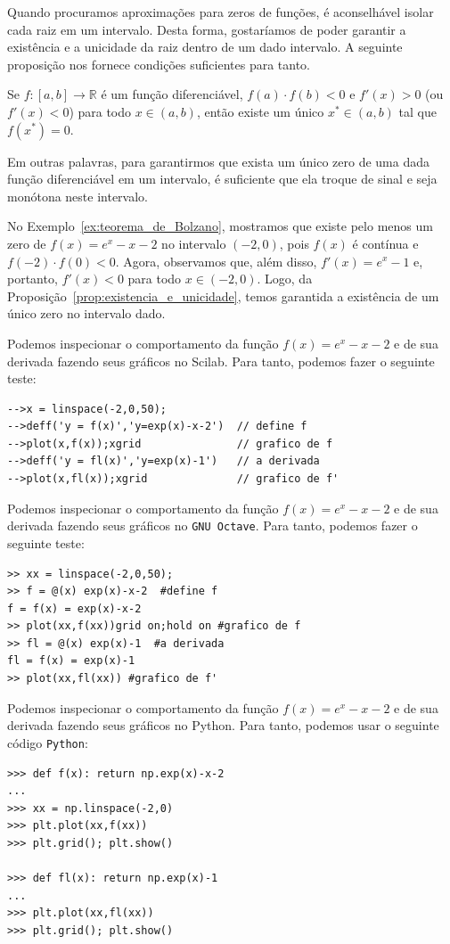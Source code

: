 Quando procuramos aproximações para zeros de funções, é aconselhável isolar cada raiz em um intervalo. Desta forma, gostaríamos de poder garantir a existência e a unicidade da raiz dentro de um dado intervalo. A seguinte proposição nos fornece condições suficientes para tanto.

\begin{prop}\label{prop:existencia_e_unicidade}
Se $f:[a, b]\to\mathbb{R}$ é um função diferenciável, $f(a)\cdot f(b)<0$ e $f'(x)>0$ (ou $f'(x)<0$) para todo $x\in(a, b)$, então existe um único $x^*\in (a, b)$ tal que $f(x^*) = 0$.
\end{prop}

Em outras palavras, para garantirmos que exista um único zero de uma dada função diferenciável em um intervalo, é suficiente que ela troque de sinal e seja monótona neste intervalo.

\begin{ex}
No Exemplo~\ref{ex:teorema_de_Bolzano}, mostramos que existe pelo menos um zero de $f(x) = e^{x}-x-2$ no intervalo $(-2,0)$, pois $f(x)$ é contínua e $f(-2)\cdot f(0) < 0$. Agora, observamos que, além disso, $f'(x)=e^x-1$ e, portanto, $f'(x) < 0$ para todo $x\in(-2,0)$. Logo, da Proposição~\ref{prop:existencia_e_unicidade}, temos garantida a existência de um único zero no intervalo dado.

\ifisscilab
Podemos inspecionar o comportamento da função $f(x)= e^x - x - 2$ e de sua derivada fazendo seus gráficos no Scilab. Para tanto, podemos fazer o seguinte teste:
\begin{verbatim}
-->x = linspace(-2,0,50);
-->deff('y = f(x)','y=exp(x)-x-2')  // define f
-->plot(x,f(x));xgrid               // grafico de f
-->deff('y = fl(x)','y=exp(x)-1')   // a derivada
-->plot(x,fl(x));xgrid              // grafico de f'
\end{verbatim}
\fi
\ifisoctave
Podemos inspecionar o comportamento da função $f(x)= e^x - x - 2$ e de sua derivada fazendo seus gráficos no \verb+GNU Octave+. Para tanto, podemos fazer o seguinte teste:
\begin{verbatim}
>> xx = linspace(-2,0,50);
>> f = @(x) exp(x)-x-2  #define f
f = f(x) = exp(x)-x-2
>> plot(xx,f(xx))grid on;hold on #grafico de f
>> fl = @(x) exp(x)-1  #a derivada
fl = f(x) = exp(x)-1
>> plot(xx,fl(xx)) #grafico de f'
\end{verbatim}
\fi
\ifispython
Podemos inspecionar o comportamento da função $f(x)= e^x - x - 2$ e de sua derivada fazendo seus gráficos no Python. Para tanto, podemos usar o seguinte código \verb+Python+:
\begin{verbatim}
>>> def f(x): return np.exp(x)-x-2
...
>>> xx = np.linspace(-2,0)
>>> plt.plot(xx,f(xx))
>>> plt.grid(); plt.show()

>>> def fl(x): return np.exp(x)-1
...
>>> plt.plot(xx,fl(xx))
>>> plt.grid(); plt.show()
\end{verbatim}
\fi
\end{ex}

